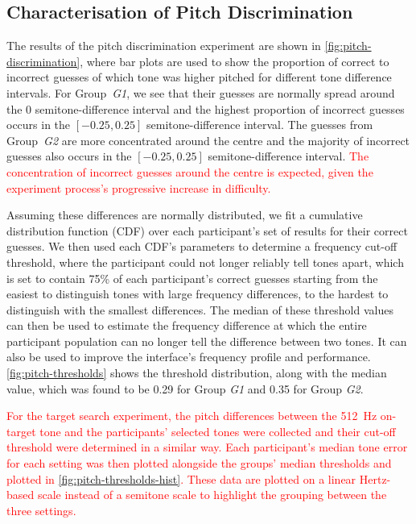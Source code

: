\documentclass[acmsmall]{acmart}
\newcommand\hl[1]{\textcolor{red}{#1}}
\begin{document}
\subsection{Characterisation of Pitch Discrimination}

The results of the pitch discrimination experiment are shown in \cref{fig:pitch-discrimination}, where bar plots are used to show the proportion of correct to incorrect guesses of which tone was higher pitched for different tone difference intervals. 
For Group~\textit{G1}, we see that their guesses are normally spread around the 0 semitone-difference interval and the highest proportion of incorrect guesses occurs in the $[-0.25, 0.25]$ semitone-difference interval. 
The guesses from Group~\textit{G2} are more concentrated around the centre and the majority of incorrect guesses also occurs in the $[-0.25, 0.25]$ semitone-difference interval.
\hl{The concentration of incorrect guesses around the centre is expected, given the experiment process's progressive increase in difficulty.}

Assuming these differences are normally distributed, we fit a cumulative distribution function (CDF) over each participant's set of results for their correct guesses.
We then used each CDF's parameters to determine a frequency cut-off threshold, where the participant could not longer reliably tell tones apart, which is set to contain 75\% of each participant's correct guesses starting from the easiest to distinguish tones with large frequency differences, to the hardest to distinguish with the smallest differences. 
The median of these threshold values can then be used to estimate the frequency difference at which the entire participant population can no longer tell the difference between two tones. 
It can also be used to improve the interface's frequency profile and performance. 
\cref{fig:pitch-thresholds} shows the threshold distribution, along with the median value, which was found to be 0.29 for Group \textit{G1} and 0.35 for Group \textit{G2}. 

\hl{For the target search experiment, the pitch differences between the \SI{512}{\hertz} on-target tone and the participants' selected tones were collected and their cut-off threshold were determined in a similar way.
Each participant's median tone error for each setting was then plotted alongside the groups' median thresholds and plotted in \cref{fig:pitch-thresholds-hist}.
These data are plotted on a linear Hertz-based scale instead of a semitone scale to highlight the grouping between the three settings.}{}
\end{document}
